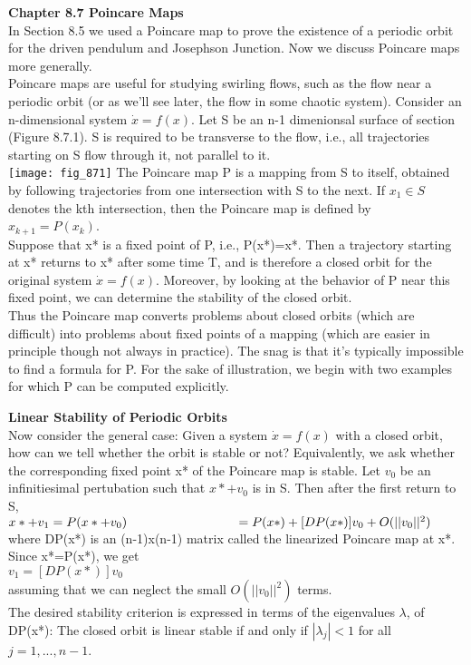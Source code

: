 \documentclass{article}
\newcommand\tab[1][1cm]{\hspace*{#1}}
\begin{document}
\textbf {Chapter 8.7 Poincare Maps} \\
In Section 8.5 we used a Poincare map to prove the existence of a periodic orbit for the driven pendulum and Josephson Junction. Now we discuss Poincare maps more generally. \\ \tab
Poincare maps are useful for studying swirling flows, such as the flow near a periodic orbit (or as we'll see later, the flow in some chaotic system). Consider an n-dimensional system $\dot{x}=f(x)$. Let S be an n-1 dimenionsal surface of section (Figure 8.7.1). S is required to be transverse to the flow, i.e., all trajectories starting on S flow through it, not parallel to it. \\ 
\texttt{[image: fig\_871]}
The Poincare map P is a mapping from S to itself, obtained by following trajectories from one intersection with S to the next. If $x_{1} \in S$ denotes the kth intersection, then the Poincare map is defined by \\ \tab \tab
$x_{k+1} = P(x_{k})$. \\
Suppose that x* is a fixed point of P, i.e., P(x*)=x*. Then a trajectory starting at x* returns to x* after some time T, and is therefore a closed orbit for the original system $\dot{x}=f(x)$. Moreover, by looking at the behavior of P near this fixed point, we can determine the stability of the closed orbit. \\ \tab
Thus the Poincare map converts problems about closed orbits (which are difficult) into problems about fixed points of a mapping (which are easier in principle though not always in practice). The snag is that it's typically impossible to find a formula for P. For the sake of illustration, we begin with two examples for which P can be computed explicitly. 

\textbf {Linear Stability of Periodic Orbits} \\ \tab
Now consider the general case: Given a system $\dot{x}=f(x)$ with a closed orbit, how can we tell whether the orbit is stable or not? Equivalently, we ask whether the corresponding fixed point x* of the Poincare map is stable. Let $v_{0}$ be an infinitiesimal pertubation such that $x*+v_{0}$ is in S. Then after the first return to S, \\ \tab \tab
$x* + v_{1}=P(x*+v_{0}) \\
\tab \tab \tab = P(x*)+[DP(x*)]v_{0} + O(||v_{0}||^{2})$ \\
where DP(x*) is an (n-1)x(n-1) matrix called the linearized Poincare map at x*. Since x*=P(x*), we get \\ \tab \tab
$v_{1}=[DP(x*)]v_{0}$ \\
assuming that we can neglect the small $O(||v_{0}||^{2})$ terms. \\ \tab
The desired stability criterion is expressed in terms of the eigenvalues $\lambda$, of DP(x*): The closed orbit is linear stable if and only if $|\lambda_{j}|<1$ for all $j=1,..., n-1$. \\ \tab
\end{document}
